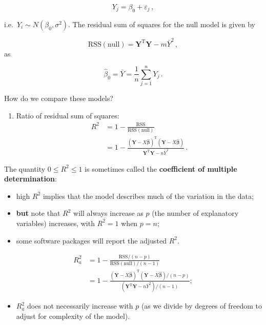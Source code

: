 \documentclass[
]{book}
\providecommand{\tightlist}{%
  \setlength{\itemsep}{0pt}\setlength{\parskip}{0pt}}
\theoremstyle{definition}
\theoremstyle{definition}
\theoremstyle{definition}
\theoremstyle{definition}
\theoremstyle{remark}
\begin{document}
\[
Y_{j}=\beta_{0}+\varepsilon_{j}\,,
\]

i.e.~\(Y_{i}\sim N(\beta_{0},\sigma^{2})\). The residual sum of squares for the null model is given by

\[
\textrm{RSS}(\textrm{null}) = \boldsymbol{Y}^{\textrm{T}}\boldsymbol{Y} - m\bar{Y}^{2}\,,
\]
as

\[
\hat{\beta}_{0} = \bar{Y} = \frac{1}{n}\sum_{j=1}^n Y_{j}\,.
\]

How do we compare these models?

\begin{enumerate}
\def\labelenumi{\arabic{enumi}.}
\tightlist
\item
  Ratio of residual sum of squares:
  \begin{align*}
  R^{2} & = 1 - \frac{\textrm{RSS}}{\textrm{RSS}(\textrm{null})} \\
  & = 1 - \frac{(\boldsymbol{Y}-X\hat{\boldsymbol{\beta}})^{\textrm{T}}(\boldsymbol{Y}-X\hat{\boldsymbol{\beta}})}{\boldsymbol{Y}^{\textrm{T}}\boldsymbol{Y}-n\bar{Y}^{2}}\,.
  \end{align*}
\end{enumerate}

The quantity \(0\leq R^{2}\leq 1\) is sometimes called the \textbf{coefficient of multiple determination}:

\begin{itemize}
\tightlist
\item
  high \(R^{2}\) implies that the model describes much of the variation in the data;
\item
  \textbf{but} note that \(R^{2}\) will always increase as \(p\) (the number of explanatory variables) increases, with \(R^{2}=1\) when \(p=n\);
\item
  some software packages will report the adjusted \(R^{2}\).
\end{itemize}

\begin{align*}
R^{2}_{a} & = 1-\frac{\textrm{RSS}/(n-p)}{\textrm{RSS}(\textrm{null})/(n-1)}\\
& = 1 - \frac{(\boldsymbol{Y} - X\hat{\boldsymbol{\beta}})^{\textrm{T}} (\boldsymbol{Y} - X\hat{\boldsymbol{\beta}})/(n-p)}{(\boldsymbol{Y}^{\textrm{T}}\boldsymbol{Y} - n\bar{Y}^{2})/(n-1)};
\end{align*}

\begin{itemize}
\tightlist
\item
  \(R_a^2\) does not necessarily increase with \(p\) (as we divide by degrees of freedom to adjust for complexity of the model).
\end{itemize}
\end{document}
